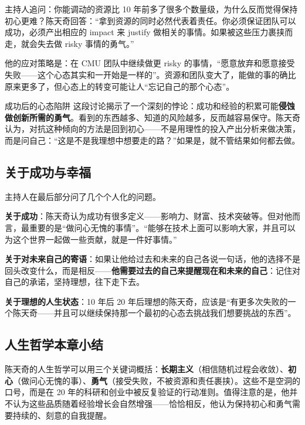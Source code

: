 主持人追问：你能调动的资源比 10 年前多了很多个数量级，为什么反而觉得保持初心更难？陈天奇回答：``拿到资源的同时必然代表着责任。你必须保证团队可以成功，必须产出相应的 impact 来 justify 做相关的事情。如果被这些压力裹挟而走，就会失去做 risky 事情的勇气。''

他的应对策略是：在 CMU 团队中继续做更 risky 的事情，``愿意放弃和愿意接受失败------这个心态其实和一开始是一样的''。资源和团队变大了，能做的事的确比原来更多了，但心态上的转变可能让人``忘记自己的那个心态''。

\begin{warningbox}{成功后的心态陷阱}
这段讨论揭示了一个深刻的悖论：成功和经验的积累可能\textbf{侵蚀做创新所需的勇气}。看到的东西越多、知道的风险越多，反而越容易保守。陈天奇认为，对抗这种倾向的方法是回到初心------不是用理性的投入产出分析来做决策，而是问自己：``这是不是我理想中想要走的路？''如果是，就不管结果如何都去做。
\end{warningbox}

\subsection{关于成功与幸福}

主持人在最后部分问了几个个人化的问题。

\textbf{关于成功}：陈天奇认为成功有很多定义------影响力、财富、技术突破等。但对他而言，最重要的是``做问心无愧的事情''。``能够在技术上面可以影响大家，并且可以为这个世界一起做一些贡献，就是一件好事情。''

\textbf{关于对未来自己的寄语}：如果让他给过去和未来的自己各说一句话，他的选择不是回头改变什么，而是相反------\textbf{他需要过去的自己来提醒现在和未来的自己}：记住对自己的承诺，坚持理想，往下走下去。

\textbf{关于理想的人生状态}：10 年后 20 年后理想的陈天奇，应该是``有更多次失败的一个陈天奇------并且可以继续保持那一个最初的心态去挑战我们想要挑战的东西''。

\subsection{人生哲学本章小结}

陈天奇的人生哲学可以用三个关键词概括：\textbf{长期主义}（相信随机过程会收敛）、\textbf{初心}（做问心无愧的事）、\textbf{勇气}（接受失败，不被资源和责任裹挟）。这些不是空洞的口号，而是在 20 年的科研和创业中被反复验证的行动准则。值得注意的是，他并不认为这些品质随着经验增长会自然增强------恰恰相反，他认为保持初心和勇气需要持续的、刻意的自我提醒。

